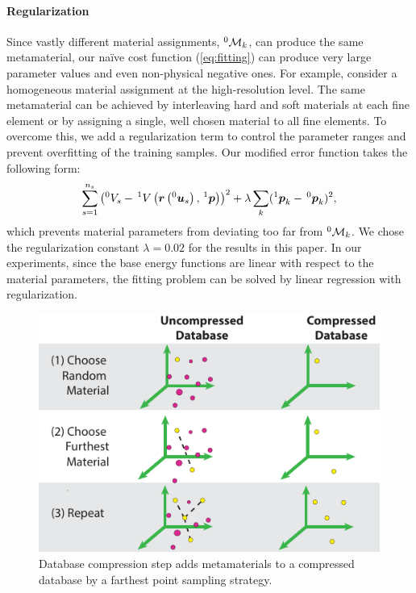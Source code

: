 \paragraph{Regularization} Since vastly different material assignments, $^0\mathcal{M}_k$, can produce the same metamaterial, our na\"{i}ve cost function (\autoref{eq:fitting}) can produce very large parameter values and even non-physical negative ones.
For example, consider a homogeneous material assignment at the high-resolution level.
The same metamaterial can be achieved by interleaving hard and soft materials at each fine element or by assigning a single, well chosen material to all fine elements.
To overcome this, we add a regularization term to control the parameter ranges and prevent overfitting of the training samples.
Our modified error function takes the following form:
\begin{equation}
\sum_{s=1}^{n_s}\left(^0V_s- \, ^1V\left(\mbox{$\bm{r}$}\left(^0\mbox{$\bm{u}$}_s\right), \, ^1\mbox{$\bm{p}$}\right)\right)^2 + 
\lambda\sum_k (^1\mbox{$\bm{p}$}_k - \, ^0\mbox{$\bm{p}$}_k)^2,
\end{equation}
which prevents material parameters from deviating too far from  $^0\mathcal{M}_k$.
We chose the regularization constant $\lambda=0.02$ for the results in this paper.
In our experiments, since the base energy functions are linear with respect to the material parameters, the fitting problem can be solved by linear regression with regularization.

\begin{figure}
	\centering
	\includegraphics[width=0.8\columnwidth]{images/compression}
	\caption{Database compression step adds metamaterials to a compressed database by a farthest point sampling strategy.}
	\label{fig:compression}
\end{figure}

